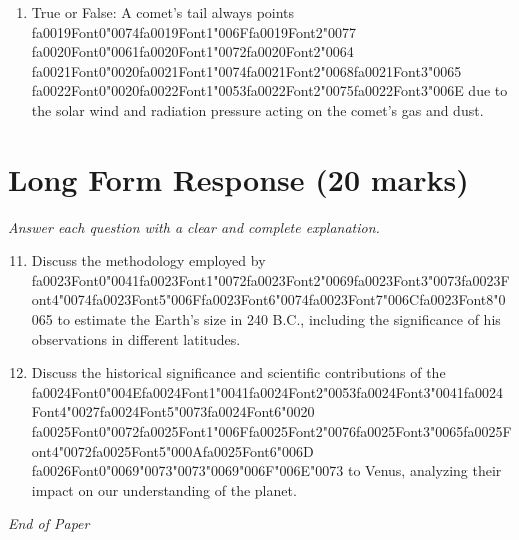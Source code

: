 \documentclass[12pt]{article}
\begin{document}
\begin{enumerate}[label=\arabic*.]
\item True or False: A comet's tail always points {\csname fa0019Font0\endcsname\char"0074}{\csname fa0019Font1\endcsname\char"006F}{\csname fa0019Font2\endcsname\char"0077} {\csname fa0020Font0\endcsname\char"0061}{\csname fa0020Font1\endcsname\char"0072}{\csname fa0020Font2\endcsname\char"0064} {\csname fa0021Font0\endcsname\char"0020}{\csname fa0021Font1\endcsname\char"0074}{\csname fa0021Font2\endcsname\char"0068}{\csname fa0021Font3\endcsname\char"0065} {\csname fa0022Font0\endcsname\char"0020}{\csname fa0022Font1\endcsname\char"0053}{\csname fa0022Font2\endcsname\char"0075}{\csname fa0022Font3\endcsname\char"006E} due to the solar wind and radiation pressure acting on the comet's gas and dust.
\end{enumerate}

\section*{Long Form Response (20 marks)}
\textit{Answer each question with a clear and complete explanation.}
\begin{enumerate}[label=\arabic*.]
\setcounter{enumi}{10}
\item Discuss the methodology employed by {\csname fa0023Font0\endcsname\char"0041}{\csname fa0023Font1\endcsname\char"0072}{\csname fa0023Font2\endcsname\char"0069}{\csname fa0023Font3\endcsname\char"0073}{\csname fa0023Font4\endcsname\char"0074}{\csname fa0023Font5\endcsname\char"006F}{\csname fa0023Font6\endcsname\char"0074}{\csname fa0023Font7\endcsname\char"006C}{\csname fa0023Font8\endcsname\char"0065} to estimate the Earth's size in 240 B.C.,
including the significance of his observations in different latitudes.
\item Discuss the historical significance and scientific contributions of the {\csname fa0024Font0\endcsname\char"004E}{\csname fa0024Font1\endcsname\char"0041}{\csname fa0024Font2\endcsname\char"0053}{\csname fa0024Font3\endcsname\char"0041}{\csname fa0024Font4\endcsname\char"0027}{\csname fa0024Font5\endcsname\char"0073}{\csname fa0024Font6\endcsname\char"0020} {\csname fa0025Font0\endcsname\char"0072}{\csname fa0025Font1\endcsname\char"006F}{\csname fa0025Font2\endcsname\char"0076}{\csname fa0025Font3\endcsname\char"0065}{\csname fa0025Font4\endcsname\char"0072}{\csname fa0025Font5\endcsname\char"000A}{\csname fa0025Font6\endcsname\char"006D}
{\csname fa0026Font0\endcsname\char"0069}{\char"0073}{\char"0073}{\char"0069}{\char"006F}{\char"006E}{\char"0073} to Venus, analyzing their impact on our understanding of the planet.
\end{enumerate}

\vfill
\noindent\textit{End of Paper}
\end{document}

